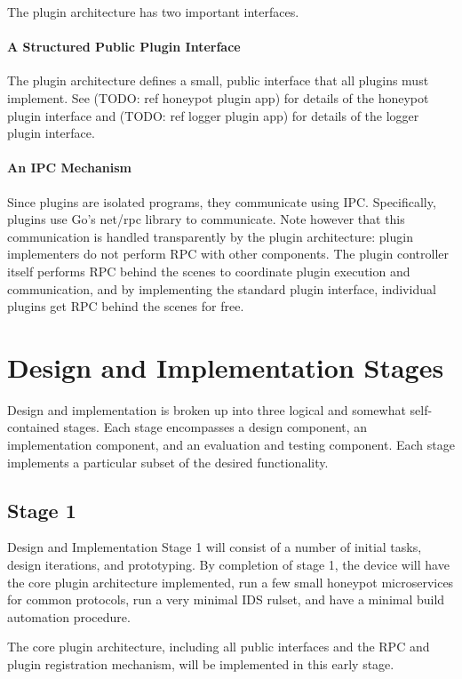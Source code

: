 The plugin architecture has two important interfaces.

\paragraph{A Structured Public Plugin Interface}
The plugin architecture defines a small, public interface that all plugins
must implement. See (TODO: ref honeypot plugin app) for details of the
honeypot plugin interface and (TODO: ref logger plugin app) for details of
the logger plugin interface.

\paragraph{An IPC Mechanism}
Since plugins are isolated programs, they communicate using IPC. Specifically,
plugins use Go's net/rpc library to communicate. Note however that this
communication is handled transparently by the plugin architecture:
plugin implementers do not perform RPC with other components. The
plugin controller itself performs RPC behind the scenes to coordinate
plugin execution and communication, and by implementing the standard
plugin interface, individual plugins get RPC behind the scenes for free.


\section{Design and Implementation Stages}

Design and implementation is broken up into three logical and somewhat
self-contained stages. Each stage encompasses a design component, an
implementation component, and an evaluation and testing component. Each stage
implements a particular subset of the desired functionality.

\subsection{Stage 1}

Design and Implementation Stage 1 will consist of a number of initial tasks,
design iterations, and prototyping. By completion of stage 1, the device
will have the core plugin architecture implemented, run a few small honeypot
microservices for common protocols, run a very minimal IDS rulset,
and have a minimal build automation procedure.


The core plugin architecture, including all public interfaces and the RPC
and plugin registration mechanism, will be implemented in this early stage.

